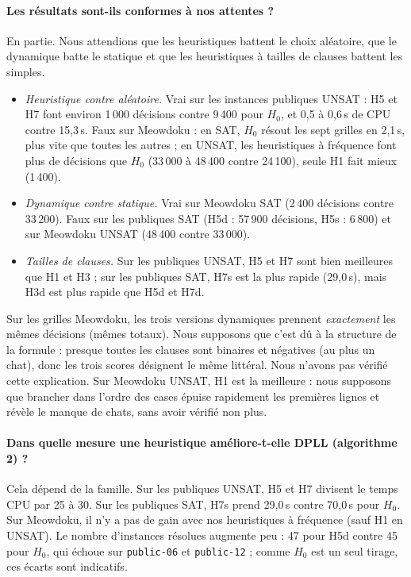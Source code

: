 \documentclass[11pt,a4paper]{article}
\begin{document}
\paragraph{Les résultats sont-ils conformes à nos attentes ?} En partie. Nous attendions que les heuristiques battent le choix aléatoire, que le dynamique batte le statique et que les heuristiques à tailles de clauses battent les simples.
\begin{itemize}
\item \emph{Heuristique contre aléatoire.} Vrai sur les instances publiques UNSAT : H5 et H7 font environ 1\,000 décisions contre 9\,400 pour $H_0$, et 0,5 à 0,6\,s de CPU contre 15,3\,s. Faux sur Meowdoku : en SAT, $H_0$ résout les sept grilles en 2,1\,s, plus vite que toutes les autres ; en UNSAT, les heuristiques à fréquence font plus de décisions que $H_0$ (33\,000 à 48\,400 contre 24\,100), seule H1 fait mieux (1\,400).
\item \emph{Dynamique contre statique.} Vrai sur Meowdoku SAT (2\,400 décisions contre 33\,200). Faux sur les publiques SAT (H5d : 57\,900 décisions, H5s : 6\,800) et sur Meowdoku UNSAT (48\,400 contre 33\,000).
\item \emph{Tailles de clauses.} Sur les publiques UNSAT, H5 et H7 sont bien meilleures que H1 et H3 ; sur les publiques SAT, H7s est la plus rapide (29,0\,s), mais H3d est plus rapide que H5d et H7d.
\end{itemize}
Sur les grilles Meowdoku, les trois versions dynamiques prennent \emph{exactement} les mêmes décisions (mêmes totaux). Nous supposons que c'est dû à la structure de la formule : presque toutes les clauses sont binaires et négatives (au plus un chat), donc les trois scores désignent le même littéral. Nous n'avons pas vérifié cette explication. Sur Meowdoku UNSAT, H1 est la meilleure : nous supposons que brancher dans l'ordre des cases épuise rapidement les premières lignes et révèle le manque de chats, sans avoir vérifié non plus.

\paragraph{Dans quelle mesure une heuristique améliore-t-elle DPLL (algorithme 2) ?} Cela dépend de la famille. Sur les publiques UNSAT, H5 et H7 divisent le temps CPU par 25 à 30. Sur les publiques SAT, H7s prend 29,0\,s contre 70,0\,s pour $H_0$. Sur Meowdoku, il n'y a pas de gain avec nos heuristiques à fréquence (sauf H1 en UNSAT). Le nombre d'instances résolues augmente peu : 47 pour H5d contre 45 pour $H_0$, qui échoue sur \texttt{public-06} et \texttt{public-12} ; comme $H_0$ est un seul tirage, ces écarts sont indicatifs.
\end{document}
